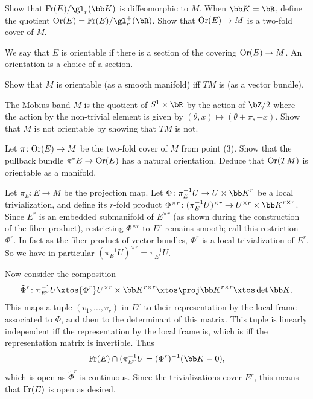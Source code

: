         \item Show that $\Fr(E)/\gl_r(\bK)$ is diffeomorphic to $M$.
        When $\bK=\bR$, define the quotient $\Or(E)=\Fr(E)/\gl_r^+(\bR)$.
        Show that ${\rm Or}(E)\to M$ is a two-fold cover of $M$.

        We say that $E$ is {\emphcolor orientable} if there is a section of the covering ${\rm Or}(E)\to M$.
        An {\emphcolor orientation} is a choice of a section.

        \item Show that $M$ is orientable (as a smooth manifold) iff $TM$ is (as a vector bundle).

        \item The Mobius band $M$ is the quotient of $S^1\times\bR$ by the action of $\bZ/2$ where the action by the non-trivial element is given by
        $(\theta,x)\mapsto(\theta+\pi,-x)$.
        Show that $M$ is not orientable by showing that $TM$ is not.

        \item Let $\pi\colon{\rm Or}(E)\to M$ be the two-fold cover of $M$ from point (3).
        Show that the pullback bundle $\pi^*E\to{\rm Or}(E)$ has a natural orientation.
        Deduce that ${\rm Or}(TM)$ is orientable as a manifold.
    \eenum

\eprob

\benum
    \item Let $\pi_E\colon E\to M$ be the projection map.
    Let $\Phi\colon\pi_E^{-1}U\to U\times\bK^r$ be a local trivialization, and define its $r$-fold product $\Phi^{\times r}\colon(\pi_E^{-1}U)^{\times r}\to U^{\times r}\times\bK^{r\times r}$.
    Since $E^r$ is an embedded submanifold of $E^{\times r}$ (as shown during the construction of the fiber product), restricting $\Phi^{\times r}$ to $E^r$ remains smooth; call this restriction $\Phi^r$.
    In fact as the fiber product of vector bundles, $\Phi^r$ is a local trivialization of $E^r$.
    So we have in particular $(\pi_E^{-1}U)^{\times r}=\pi_{E^r}^{-1}U$.

    Now consider the composition
    $$ \tilde\Phi^r \colon \pi_{E^r}^{-1}U \xtos{\Phi^r} U^{\times r}\times\bK^{r\times r} \xtos\proj \bK^{r\times r} \xtos\det \bK . $$
    This maps a tuple $(v_1,\dots,v_r)$ in $E^r$ to their representation by the local frame associated to $\Phi$, and then to the determinant of this matrix.
    This tuple is linearly independent iff the representation by the local frame is, which is iff the representation matrix is invertible.
    Thus
    $$ \Fr(E)\cap(\pi_{E^r}^{-1}U = (\tilde\Phi^r)^{-1}(\bK-0) , $$
    which is open as $\tilde\Phi^r$ is continuous.
    Since the trivializations cover $E^r$, this means that ${\rm Fr}(E)$ is open as desired.

